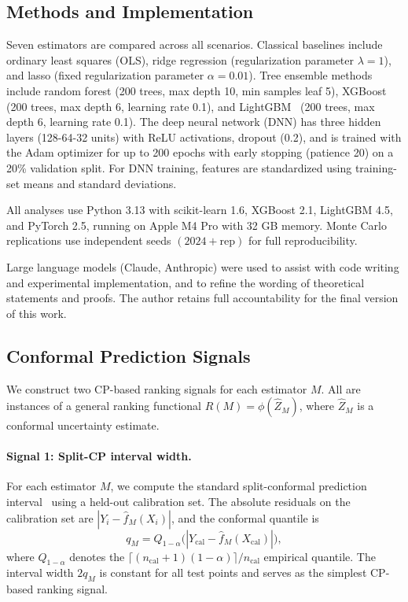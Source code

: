 \documentclass[a4paper,11pt]{article}
\begin{document}
\subsection{Methods and Implementation}
\label{sec:methods}

Seven estimators are compared across all scenarios. Classical baselines include ordinary least squares (OLS), ridge regression (regularization parameter $\lambda = 1$), and lasso (fixed regularization parameter $\alpha = 0.01$). Tree ensemble methods include random forest (200 trees, max depth 10, min samples leaf 5), XGBoost~\citep{chen2016} (200 trees, max depth 6, learning rate 0.1), and LightGBM~\citep{ke2017} (200 trees, max depth 6, learning rate 0.1). The deep neural network (DNN) has three hidden layers (128-64-32 units) with ReLU activations, dropout (0.2), and is trained with the Adam optimizer for up to 200 epochs with early stopping (patience 20) on a 20\% validation split. For DNN training, features are standardized using training-set means and standard deviations.

All analyses use Python 3.13 with scikit-learn 1.6, XGBoost 2.1, LightGBM 4.5, and PyTorch 2.5, running on Apple M4 Pro with 32 GB memory. Monte Carlo replications use independent seeds $(2024 + \text{rep})$ for full reproducibility.

Large language models (Claude, Anthropic) were used to assist with code writing and experimental implementation, and to refine the wording of theoretical statements and proofs. The author retains full accountability for the final version of this work.

\subsection{Conformal Prediction Signals}
\label{sec:cp-signals}

We construct two CP-based ranking signals for each estimator $M$. All are instances of a general ranking functional $R(M) = \phi(\hat{Z}_M)$, where $\hat{Z}_M$ is a conformal uncertainty estimate.

\paragraph{Signal 1: Split-CP interval width.} For each estimator $M$, we compute the standard split-conformal prediction interval~\citep{lei2018, angelopoulos2023} using a held-out calibration set. The absolute residuals on the calibration set are $|Y_i - \hat{f}_M(X_i)|$, and the conformal quantile is
\begin{equation}
    q_M = Q_{1-\alpha}\bigl(|Y_{\text{cal}} - \hat{f}_M(X_{\text{cal}})|\bigr),
\end{equation}
where $Q_{1-\alpha}$ denotes the $\lceil (n_{\text{cal}}+1)(1-\alpha)\rceil / n_{\text{cal}}$ empirical quantile. The interval width $2q_M$ is constant for all test points and serves as the simplest CP-based ranking signal.
\end{document}
